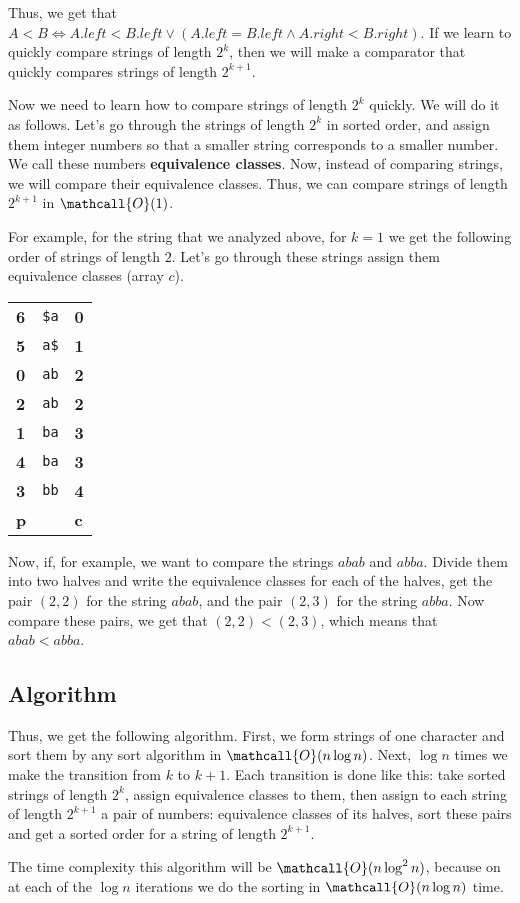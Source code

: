 \documentclass[11pt]{article}
\begin{document}
Thus, we get that \(A < B \iff A.left < B.left \lor (A.left = B.left \land A.right < B.right)\). If we
learn to quickly compare strings of length \(2^k\), then we will make a comparator that quickly
compares strings of length \(2^{k + 1}\).

Now we need to learn how to compare strings of length \(2^k\) quickly. We will do it as
follows. Let's go through the strings of length \(2^k\) in sorted order, and assign them integer
numbers so that a smaller string corresponds to a smaller number. We call these numbers
\textbf{equivalence classes}. Now, instead of comparing strings, we will compare their equivalence
classes. Thus, we can compare strings of length \(2^{k + 1}\) in \(\mathcall{O}(1)\).

For example, for the string that we analyzed above, for \(k = 1\) we get the following order of
strings of length \(2\). Let's go through these strings assign them equivalence classes (array
\(c\)).

\begin{center}
\begin{tabular}{lll}
\textbf{6} & \texttt{\$a} & \textbf{0}\\
\textbf{5} & \texttt{a\$} & \textbf{1}\\
\textbf{0} & \texttt{ab} & \textbf{2}\\
\textbf{2} & \texttt{ab} & \textbf{2}\\
\textbf{1} & \texttt{ba} & \textbf{3}\\
\textbf{4} & \texttt{ba} & \textbf{3}\\
\textbf{3} & \texttt{bb} & \textbf{4}\\
\textbf{p} &  & \textbf{c}\\
\end{tabular}
\end{center}

Now, if, for example, we want to compare the strings \(abab\) and \(abba\). Divide them into two
halves and write the equivalence classes for each of the halves, get the pair \((2, 2)\) for the
string \(abab\), and the pair \((2, 3)\) for the string \(abba\). Now compare these pairs, we get that
\((2, 2) < (2, 3)\), which means that \(abab < abba\).

\subsection{Algorithm}
\label{sec:orgb47f146}
Thus, we get the following algorithm. First, we form strings of one character and sort them by
any sort algorithm in \(\mathcall{O}(n \log n)\). Next, \(\log n\) times we make the transition from
\(k\) to \(k + 1\). Each transition is done like this: take sorted strings of length \(2^k\), assign
equivalence classes to them, then assign to each string of length \(2^{k + 1}\) a pair of numbers:
equivalence classes of its halves, sort these pairs and get a sorted order for a string of length
\(2^{k + 1}\).

The time complexity this algorithm will be \(\mathcall{O}(n \log^2 n)\), because on at each of the
\(\log n\) iterations we do the sorting in \(\mathcall{O}(n \log n)\) time.
\end{document}
